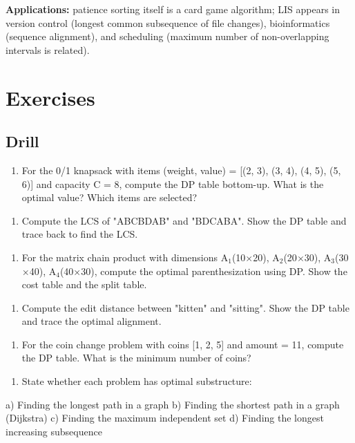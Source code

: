 \textbf{Applications:} patience sorting itself is a card game algorithm; LIS appears in version control (longest common subsequence of file changes), bioinformatics (sequence alignment), and scheduling (maximum number of non-overlapping intervals is related).

\section{Exercises}

\subsection{Drill}

\begin{enumerate}
\item For the 0/1 knapsack with items (weight, value) = [(2, 3), (3, 4), (4, 5), (5, 6)] and capacity C = 8, compute the DP table bottom-up. What is the optimal value? Which items are selected?
\end{enumerate}

\begin{enumerate}
\item Compute the LCS of "ABCBDAB" and "BDCABA". Show the DP table and trace back to find the LCS.
\end{enumerate}

\begin{enumerate}
\item For the matrix chain product with dimensions A$_{1}$(10$\times $20), A$_{2}$(20$\times $30), A$_{3}$(30$\times $40), A$_{4}$(40$\times $30), compute the optimal parenthesization using DP. Show the cost table and the split table.
\end{enumerate}

\begin{enumerate}
\item Compute the edit distance between "kitten" and "sitting". Show the DP table and trace the optimal alignment.
\end{enumerate}

\begin{enumerate}
\item For the coin change problem with coins [1, 2, 5] and amount = 11, compute the DP table. What is the minimum number of coins?
\end{enumerate}

\begin{enumerate}
\item State whether each problem has optimal substructure:
\end{enumerate}
   a) Finding the longest path in a graph
   b) Finding the shortest path in a graph (Dijkstra)
   c) Finding the maximum independent set
   d) Finding the longest increasing subsequence

